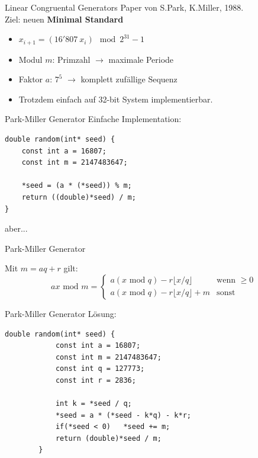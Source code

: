 \documentclass{beamer}
\begin{document}
\begin{frame}{Linear Congruental Generators}
	Paper von S.Park, K.Miller, 1988. \\ Ziel: neuen \textbf{Minimal Standard}
	
	\begin{itemize}
		\item<2-> $x_{i+1} = \left( 16'807 \: x_i \right) \mod{2^{31}-1}$ 
		\item<2-> Modul $m$: Primzahl $\rightarrow$ maximale Periode
		\item<2-> Faktor $a$: $7^5$ $\rightarrow$ komplett zufällige Sequenz
		\item<2-> Trotzdem einfach auf 32-bit System implementierbar.
	\end{itemize}
\end{frame}
\begin{frame}[fragile]{Park-Miller Generator}
	Einfache Implementation: \vspace{0.5cm}
	\begin{lstlisting}[style=C]
double random(int* seed) {
    const int a = 16807;
    const int m = 2147483647;
	
    *seed = (a * (*seed)) % m;
    return ((double)*seed) / m;
}
	\end{lstlisting}
	\vspace{0.5cm}
	aber...
\end{frame}
\begin{frame}{Park-Miller Generator}

	Mit $m = aq + r$ gilt:
	\begin{equation*}
		a x \text{ mod } m = 
			\begin{cases}
				a \left(x \text{ mod } q\right) - r \lfloor x / q\rfloor & \text{wenn }\geq 0 \\
				a \left(x \text{ mod } q\right) - r \lfloor x / q\rfloor + m & \text{sonst}
			\end{cases}
	\end{equation*}
\end{frame}
\begin{frame}[fragile]{Park-Miller Generator}
	Lösung: \vspace{0.5cm}
	\begin{lstlisting}[style=C]
		double random(int* seed) {
		    const int a = 16807;
		    const int m = 2147483647;
		    const int q = 127773;
		    const int r = 2836;
			
		    int k = *seed / q;
		    *seed = a * (*seed - k*q) - k*r;
		    if(*seed < 0)   *seed += m;
		    return (double)*seed / m;
		}
	\end{lstlisting}
\end{frame}
\end{document}
